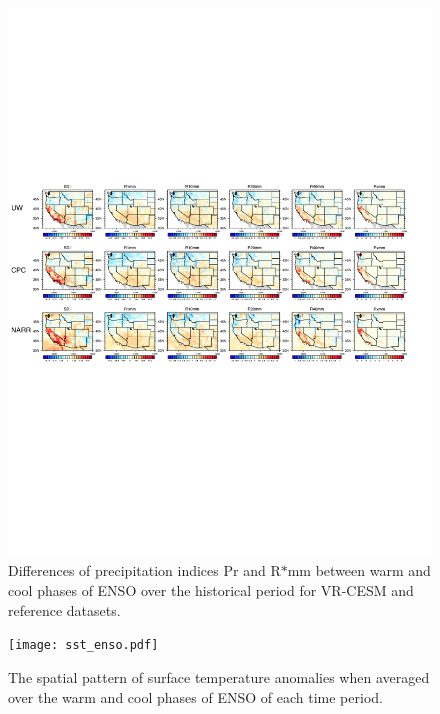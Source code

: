 \documentclass{ametsoc}
\begin{document}
\begin{figure}
\begin{center}
\includegraphics[width=6in]{wd_index_enso_ref_wetSeason.pdf}
\caption{Differences of precipitation indices Pr and R$\ast$mm between warm and cool phases of ENSO over the historical period for VR-CESM and reference datasets.}
\end{center}
\label{fig:S6}
\end{figure}


\begin{figure}
\begin{center}
\texttt{[image: sst\_enso.pdf]}
\caption{The spatial pattern of surface temperature anomalies when averaged over the warm and cool phases of ENSO of each time period.}
\end{center}
\label{fig:S7}
\end{figure}

\end{document}
